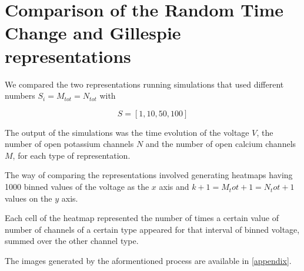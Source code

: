 \section{Comparison of the Random Time Change and Gillespie representations}

We compared the two representations running simulations that used different numbers $S_{i} = M_{tot} = N_{tot}$ with

$$S = [1, 10, 50, 100]$$

The output of the simulations was the time evolution of the voltage $V$, the number of open potassium channels $N$ and the number of open calcium channels $M$, for each type of representation.

The way of comparing the representations involved generating heatmaps having 1000 binned values of the voltage as the $x$ axis and $k + 1 = M_tot + 1 = N_tot  + 1$ values on the $y$ axis. 

Each cell of the heatmap represented the number of times a certain value of number of channels of a certain type appeared for that interval of binned voltage, summed over the other channel type. 

The images generated by the aformentioned process are available in \ref{appendix}. 